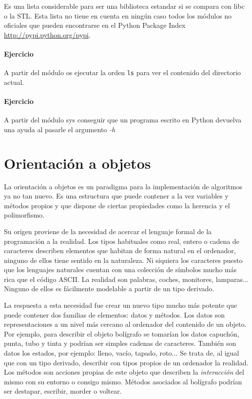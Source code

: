 \documentclass[a4paper,10pt]{article}
\begin{document}
Es una lista considerable para ser una biblioteca estandar si se
compara con libc o la STL.  Esta lista no tiene en cuenta en ningún
caso todos los módulos no oficiales que pueden encontrarse en el
Python Package Index \url{http://pypi.python.org/pypi}.

\begin{small}
  \paragraph*{Ejercicio}
  A partir del módulo os ejecutar la orden \texttt{ls} para ver el
  contenido del directorio actual.
\end{small}

\begin{small}
  \paragraph*{Ejercicio}
  A partir del módulo sys conseguir que un programa escrito en Python
  devuelva una ayuda al pasarle el argumento \emph{-h}
\end{small}

\section{Orientación a objetos}

La orientación a objetos es un paradigma para la implementación de
algoritmos ya no tan nuevo.  Es una estructura que puede contener a la
vez variables y métodos propios y que dispone de ciertas propiedades
como la herencia y el polimorfismo.

Su origen proviene de la necesidad de acercar el lenguaje formal de la
programación a la realidad.  Los tipos habituales como real, entero o
cadena de caracteres describen elementos que habitan de forma natural
en el ordenador, ninguno de ellos tiene sentido en la naturaleza.  Ni
siquiera los caracteres puesto que los lenguajes naturales cuentan con
una colección de símbolos mucho más rica que el código ASCII.  La
realidad son palabras, coches, monitores, lamparas... Ninguno de ellos
es fácilmente modelable a partir de un tipo derivado.

La respuesta a esta necesidad fue crear un nuevo tipo mucho más
potente que puede contener dos familias de elementos: datos y
métodos. Los datos son representaciones a un nivel más cercano al
ordenador del contenido de un objeto.  Por ejemplo, para describir el
objeto bolígrafo se tomarían los datos capuchón, punta, tubo y tinta y
podrían ser simples cadenas de caracteres. También son datos los
estados, por ejemplo: lleno, vacío, tapado, roto... Se trata de, al
igual que con un tipo derivado, describir con tipos propios de un
ordenador la realidad.  Los métodos son acciones propias de este
objeto que describen la \emph{interacción} del mismo con su entorno o
consigo mismo.  Métodos asociados al bolígrafo podrían ser destapar,
escribir, morder o voltear.
\end{document}
